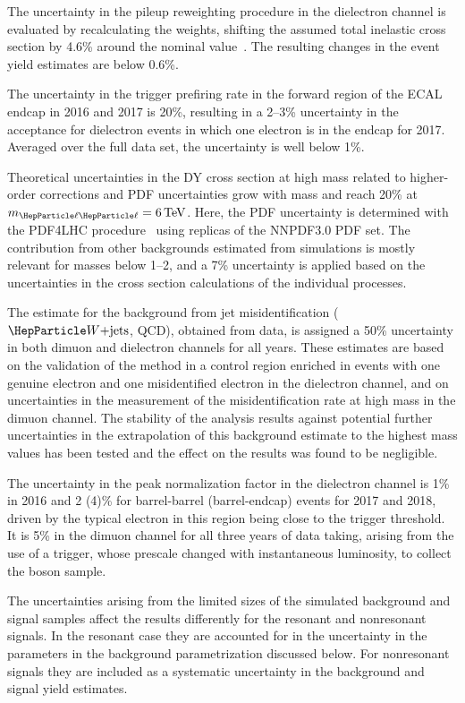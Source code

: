 \documentclass[11pt,twoside,a4paper,cmspaper,final,collab]{cms-tdr}
\begin{document}
The uncertainty in the pileup reweighting procedure in the dielectron channel is evaluated by recalculating the weights, shifting the assumed total inelastic cross section by 4.6\% around the nominal value~\cite{Sirunyan:2018nqx}. The resulting changes in the event yield estimates are below 0.6\%. 

The uncertainty in the trigger prefiring rate in the forward region of the ECAL endcap in 2016 and 2017 is 20\%, resulting in a 2--3\% uncertainty in the acceptance for dielectron events in which one electron is in the endcap for 2017. Averaged over the full data set, the uncertainty is well below 1\%.

Theoretical uncertainties in the DY cross section at high mass related to higher-order corrections and PDF uncertainties grow with mass and reach 20\% at $\mll = 6\TeV$. Here, the PDF uncertainty is determined with the PDF4LHC procedure~\cite{Butterworth:2015oua} using replicas of the NNPDF3.0 PDF set. The contribution from other backgrounds estimated from simulations is mostly relevant for masses below 1--2\TeV, and a 7\% uncertainty is applied based on the uncertainties in the cross section calculations of the individual processes. 

The estimate for the background from jet misidentification ($\PW\text{+jets}$, QCD), obtained from data, is assigned a 50\% uncertainty in both dimuon and dielectron channels for all years. These estimates are based on the validation of the method in a control region enriched in events with one genuine electron and one misidentified electron in the dielectron channel, and on uncertainties in the measurement of the misidentification rate at high mass in the dimuon channel. The stability of the analysis results against potential further uncertainties in the extrapolation of this background estimate to the highest mass values has been tested and the effect on the results was found to be negligible.

The uncertainty in the \PZ peak normalization factor in the dielectron channel is 1\% in 2016 and 2 (4)\% for barrel-barrel (barrel-endcap) events for 2017 and 2018, driven by the typical electron \pt in this region being close to the trigger threshold. It is 5\% in the dimuon channel for all three years of data taking, arising from the use of a trigger, whose prescale changed with instantaneous luminosity, to collect the \PZ boson sample. 

The uncertainties arising from the limited sizes of the simulated background and signal samples affect the results differently for the resonant and nonresonant signals. In the resonant case they are accounted for in the uncertainty in the parameters in the background parametrization discussed below. For nonresonant signals they are included as a systematic uncertainty in the background and signal yield estimates. 
\end{document}
